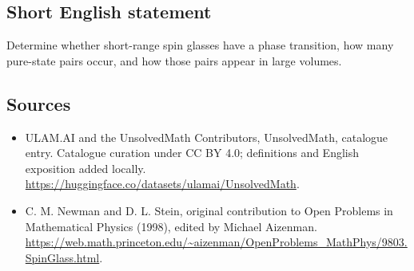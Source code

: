 \documentclass[11pt]{article}
\begin{document}
\subsection{Short English statement}
Determine whether short-range spin glasses have a phase transition, how many pure-state pairs occur, and how those pairs appear in large volumes.
\subsection{Sources}
\begin{itemize}
\item[\hypertarget{source:statement:1}{S1}] ULAM.AI and the UnsolvedMath Contributors, UnsolvedMath, catalogue entry. Catalogue curation under CC BY 4.0; definitions and English exposition added locally.
\url{https://huggingface.co/datasets/ulamai/UnsolvedMath}.
\item[\hypertarget{source:statement:2}{S2}] C. M. Newman and D. L. Stein, original contribution to Open Problems in Mathematical Physics (1998), edited by Michael Aizenman.
\url{https://web.math.princeton.edu/~aizenman/OpenProblems_MathPhys/9803.SpinGlass.html}.
\end{itemize}
\label{end:statement}
\end{document}
